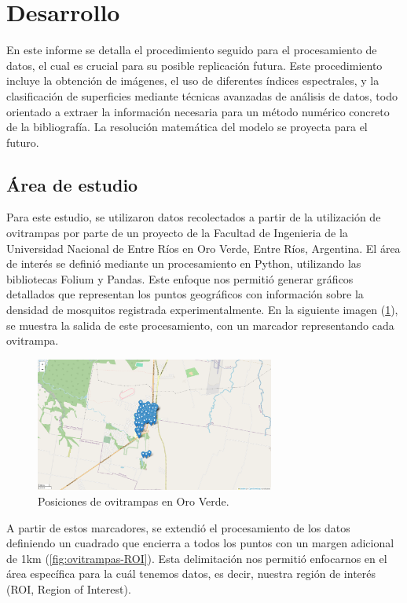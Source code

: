 

\section{Desarrollo}

En este informe se detalla el procedimiento seguido para el procesamiento de datos, el cual es crucial para su posible replicación futura. Este procedimiento incluye la obtención de imágenes, el uso de diferentes índices espectrales, y la clasificación de superficies mediante técnicas avanzadas de análisis de datos, todo orientado a extraer la información necesaria para un método numérico concreto de la bibliografía. La resolución matemática del modelo se proyecta para el futuro.

\subsection{Área de estudio}

Para este estudio, se utilizaron datos recolectados a partir de la utilización de ovitrampas por parte de un proyecto de la Facultad de Ingenieria de la Universidad Nacional de Entre Ríos en Oro Verde, Entre Ríos, Argentina. El área de interés se definió mediante un procesamiento en Python, utilizando las bibliotecas Folium y Pandas. Este enfoque nos permitió generar gráficos detallados que representan los puntos geográficos con información sobre la densidad de mosquitos registrada experimentalmente. En la siguiente imagen (\figurename \ref{fig:ovitrampas}), se muestra la salida de este procesamiento, con un marcador representando cada ovitrampa.
	
\begin{figure}[H]
	\includegraphics[width=0.7\textwidth]{ovitrampas.png}
	\centering
	\caption{Posiciones de ovitrampas en Oro Verde.}
	\label{fig:ovitrampas}
	
\end{figure}

A partir de estos marcadores, se extendió el procesamiento de los datos definiendo un cuadrado que encierra a todos los puntos con un margen adicional de 1km (\figurename \ref{fig:ovitrampas-ROI}). Esta delimitación nos permitió enfocarnos en el área específica para la cuál tenemos datos, es decir, nuestra región de interés (ROI, Region of Interest).

